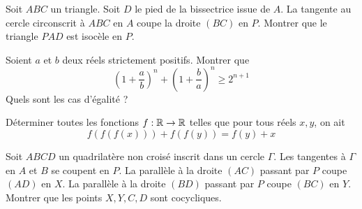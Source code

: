 

\begin{exo}
Soit $ABC$ un triangle. Soit $D$ le pied de la bissectrice issue de $A$. La tangente au cercle circonscrit à $ABC$ en $A$ coupe la droite $(BC)$ en $P$. Montrer que le triangle $PAD$ est isocèle en $P$.
\end{exo}


\begin{exo}
Soient $a$ et $b$ deux réels strictement positifs. Montrer que
$$\left(1+\frac a b\right)^n+\left(1+\frac b a\right)^n\ge 2^{n+1} $$
Quels sont les cas d'égalité ?
\end{exo}


\begin{exo}
Déterminer toutes les fonctions $f : \mathbb R\to \mathbb R$ telles que pour tous réels $x,y$, on ait
$$f(f(f(x))) + f(f(y)) = f(y) + x$$
\end{exo}


\begin{exo}
Soit $ABCD$ un quadrilatère non croisé inscrit dans un cercle $\Gamma$. Les tangentes à $\Gamma$ en $A$ et $B$ se coupent en $P$. La parallèle à la droite $(AC)$ passant par $P$ coupe $(AD)$ en $X$. La parallèle à la droite $(BD)$ passant par $P$ coupe $(BC)$ en $Y$. \\
Montrer que les points $X,Y,C,D$ sont cocycliques.
\end{exo}




